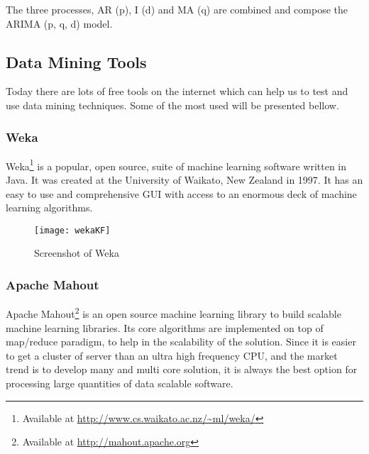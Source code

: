 The three processes, AR (p), I (d) and MA (q) are combined and compose the ARIMA
(p, q, d) model.

\subsection{Data Mining Tools} Today there are lots of free tools on the
internet which can help us to test and use data mining techniques. Some of the
most used will be presented bellow.

\subsubsection{Weka}

Weka\footnote{ Available at \url{http://www.cs.waikato.ac.nz/~ml/weka/}} is a
popular, open source, suite of machine learning software written in Java. It was
created at the University of Waikato, New Zealand in 1997. It has an easy to use
and comprehensive GUI with access to an enormous deck of machine learning
algorithms.

\begin{figure}[h] \begin{center} \leavevmode
\texttt{[image: wekaKF]} \caption{Screenshot of Weka
\protect\footnotemark} \label{fig:RapidMiner} \end{center} \end{figure}

\subsubsection{Apache Mahout}

Apache Mahout\footnote{ Available at \url{http://mahout.apache.org}} is an open
source machine learning library to build scalable machine learning libraries.
Its core algorithms are implemented on top of map/reduce paradigm, to help in
the scalability of the solution. Since it is easier to get a cluster of server
than an ultra high frequency CPU, and the market trend is to develop many and
multi core solution, it is always the best option for processing large
quantities of data scalable software.

